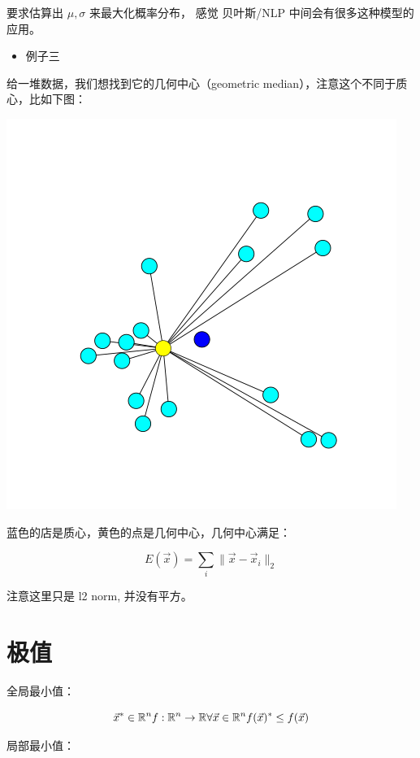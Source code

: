 \documentclass[
]{book}
\providecommand{\tightlist}{%
  \setlength{\itemsep}{0pt}\setlength{\parskip}{0pt}}
\begin{document}
要求估算出 \(\mu, \sigma\) 来最大化概率分布， 感觉 贝叶斯/NLP 中间会有很多这种模型的应用。

\begin{itemize}
\tightlist
\item
  例子三
\end{itemize}

给一堆数据，我们想找到它的几何中心（geometric median），注意这个不同于质心，比如下图：

\includegraphics{images/480px-Geometric_median_example.png}

蓝色的店是质心，黄色的点是几何中心，几何中心满足：

\[
E(\vec{x}) = \sum_i \parallel \vec{x} - \vec{x}_i \parallel_2
\]

注意这里只是 l2 norm, 并没有平方。

\hypertarget{ux6781ux503c}{%
\section{极值}\label{ux6781ux503c}}

全局最小值：

\[
\vec{x}^* \in  \mathbb{R}^n \\
f: \mathbb{R}^n \to \mathbb{R} \\
\forall \vec{x} \in \mathbb{R}^n f(\vec{x})^* \le f(\vec{x}) 
\]

局部最小值：
\end{document}
